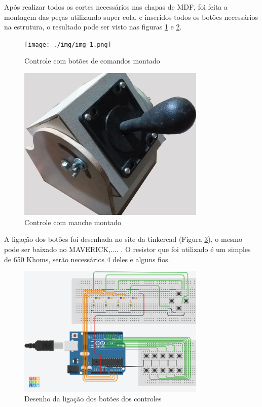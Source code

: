 \documentclass[
	12pt,			%
	openright,		%
	oneside,			%
	a4paper,			%
	chapter=TITLE,		%
	english,			%
	brazil,			%
	]{abntex2}
\begin{document}
Após realizar todos os cortes necessários nas chapas de MDF, foi feita a montagem das peças utilizando super cola, e inseridos todos os botões necessários na estrutura, o resultado pode ser visto nas figuras \ref{img:img-1} e \ref{img:img-10}.

\begin{figure}[H]
	\centering
		\texttt{[image: ./img/img-1.png]}
		\caption{Controle com botões de comandos montado}
		\label{img:img-1}
\end{figure}

\begin{figure}[H]
	\centering
		\includegraphics[width=0.8\textwidth]{./img/img-10.jpg}
		\caption{Controle com manche montado}
		\label{img:img-10}
\end{figure}

A ligação dos botões foi desenhada no site da tinkercad (Figura \ref{img:img-19}), o mesmo pode ser baixado no MAVERICK,.... . O resistor que foi utilizado é um simples de 650 Khoms, serão necessários 4 deles e alguns fios.

\begin{figure}[H]
	\centering
		\includegraphics[width=0.8\textwidth]{./img/img-19.png}
		\caption{Desenho da ligação dos botões dos controles}
		\label{img:img-19}
\end{figure}
\end{document}

